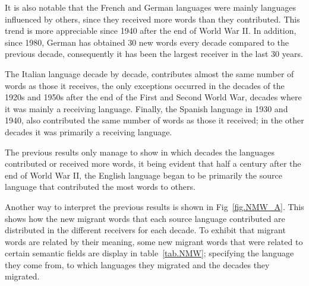 \documentclass[10pt,letterpaper]{article} %
\begin{document}
It is also notable that the French and German languages ​​were mainly
languages ​​influenced by others, since they received more words than
they contributed. This trend is more appreciable since 1940 after the end of
World War II. In addition, since 1980, German has obtained 30 new words every
decade compared to the previous decade, consequently it has been the largest
receiver in the last 30 years.

The Italian language decade by decade, contributes almost the same number of words as those it receives, the only exceptions occurred in the decades of the 1920s and 1950s after the end of the First and Second World War, decades where it was mainly a receiving language. Finally, the Spanish language in 1930 and 1940, also contributed the same number of words as those it received; in the other decades it was primarily a receiving language.

The previous results only manage to show in which decades the languages contributed or received more words, it being evident that half a century after the end of World War II, the English language began to be primarily the source language that contributed the most words to others. 

Another way to interpret the previous results is shown in Fig~\ref{fig.NMW_A}. This shows how the new migrant words that each source language contributed are distributed in the different receivers for each decade. To exhibit that migrant words are related by their meaning, some new migrant words that were related to certain semantic fields are display in table~\ref{tab.NMW}; specifying the language they come from, to which languages they migrated and the decades they migrated.
\end{document}
